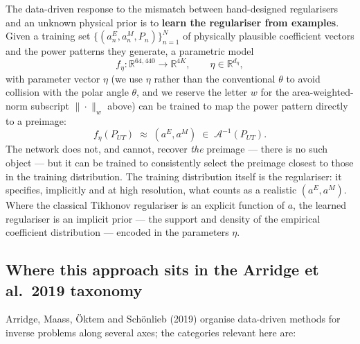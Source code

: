 \documentclass[
  english,
  11pt,
]{report}
\begin{document}
The data-driven response to the mismatch between hand-designed
regularisers and an unknown physical prior is to \textbf{learn the
regulariser from examples}. Given a training set
\(\{(a^E_n, a^M_n, P_n)\}_{n=1}^N\) of physically plausible coefficient
vectors and the power patterns they generate, a parametric model \[
f_\eta \colon \mathbb{R}^{64{,}440} \to \mathbb{R}^{4K},\qquad \eta\in\mathbb{R}^{d_\eta},
\] with parameter vector \(\eta\) (we use \(\eta\) rather than the
conventional \(\theta\) to avoid collision with the polar angle
\(\theta\), and we reserve the letter \(w\) for the area-weighted-norm
subscript \(\|\cdot\|_w\) above) can be trained to map the power pattern
directly to a preimage: \[
f_\eta(P_{UT}) \;\approx\; (a^E, a^M)\;\in\;\mathcal{A}^{-1}(P_{UT}).
\] The network does not, and cannot, recover \emph{the} preimage ---
there is no such object --- but it can be trained to consistently select
the preimage closest to those in the training distribution. The training
distribution itself is the regulariser: it specifies, implicitly and at
high resolution, what counts as a realistic \((a^E, a^M)\). Where the
classical Tikhonov regulariser is an explicit function of \(a\), the
learned regulariser is an implicit prior --- the support and density of
the empirical coefficient distribution --- encoded in the parameters
\(\eta\).

\subsection{Where this approach sits in the Arridge et al.~2019
taxonomy}\label{where-this-approach-sits-in-the-arridge-et-al.-2019-taxonomy}

Arridge, Maass, Öktem and Schönlieb (2019) organise data-driven methods
for inverse problems along several axes; the categories relevant here
are:
\end{document}
